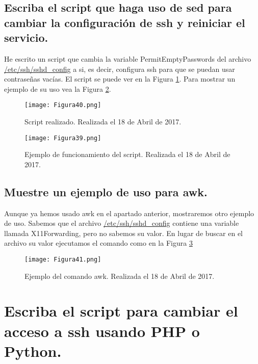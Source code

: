 \vspace{6mm}

\subsection{Escriba el script que haga uso de sed para cambiar la configuración de ssh y reiniciar el servicio.}

He escrito un script que cambia la variable PermitEmptyPasswords del archivo \url{/etc/ssh/sshd_config} a si, es decir, configura ssh para que se puedan usar 
contraseñas vacías. El script se puede ver en la Figura \ref{fig:figura40}. Para mostrar un ejemplo de su uso vea la Figura \ref{fig:figura39}.
 
\begin{figure}[H] 
\centering
\texttt{[image: Figura40.png]}  
\caption{Script realizado. Realizada el 18 de Abril de 2017.} \label{fig:figura40}
\end{figure}
\begin{figure}[H] 
\centering
\texttt{[image: Figura39.png]}  
\caption{Ejemplo de funcionamiento del script. Realizada el 18 de Abril de 2017.} \label{fig:figura39}
\end{figure}
\vspace{6mm}

\subsection{Muestre un ejemplo de uso para awk.}

Aunque ya hemos usado awk en el apartado anterior, mostraremos otro ejemplo de uso. Sabemos que el archivo \url{/etc/ssh/sshd_config} contiene una variable 
llamada X11Forwarding, pero no sabemos su valor. En lugar de buscar en el archivo su valor ejecutamos el comando como en la Figura \ref{fig:figura41}

\begin{figure}[H] 
\centering
\texttt{[image: Figura41.png]}  
\caption{Ejemplo del comando awk. Realizada el 18 de Abril de 2017.} \label{fig:figura41}
\end{figure}



\section{Escriba el script para cambiar el acceso a ssh usando PHP o Python.}

